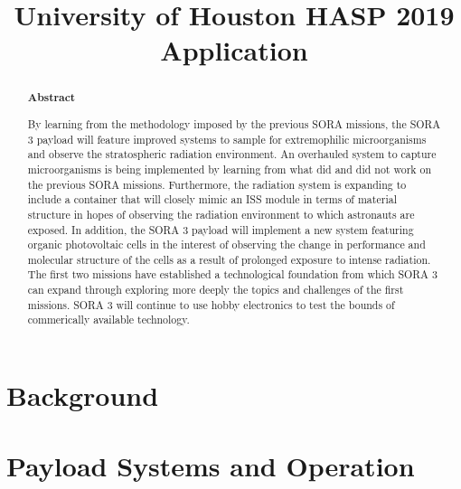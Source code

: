 \documentclass[aps,superscriptaddress,floatfix,nofootinbib,showpacs,amsmath,amssymb,altaffilletter,floatfix,onecolumn]{revtex4-1}
\begin{document}
\title{University of Houston HASP 2019 Application}

\begin{abstract}
  \begin{center}
    {\bf Abstract}
  \end{center}

  By learning from the methodology imposed by the previous SORA missions, the SORA 3 payload will feature improved systems to sample for extremophilic microorganisms and observe the stratospheric radiation environment.
  An overhauled system to capture microorganisms is being implemented by learning from what did and did not work on the previous SORA missions.
  Furthermore, the radiation system is expanding to include a container that will closely mimic an ISS module in terms of material structure in hopes of observing the radiation environment to which astronauts are exposed.
  In addition, the SORA 3 payload will implement a new system featuring organic photovoltaic cells in the interest of observing the change in performance and molecular structure of the cells as a result of prolonged exposure to intense radiation.
  The first two missions have established a technological foundation from which SORA 3 can expand through exploring more deeply the topics and challenges of the first missions. SORA 3 will continue to use hobby electronics to test the bounds of commerically available technology.
  
  \newpage %
\end{abstract}


\setlength{\parindent}{1em}
\setdefaultleftmargin{1em}{1em}{}{}{}{}
\setcounter{page}{0}\thispagestyle{empty}
\maketitle
\onecolumngrid
\setcounter{tocdepth}{2}
\setcounter{page}{0}\thispagestyle{empty}
\tableofcontents
\setcounter{page}{0}\thispagestyle{empty}
\newpage


\section{Background}
    
    

\section{Payload Systems and Operation}
\label{sec:PayloadSystems}
    
    
    
    
\end{document}
